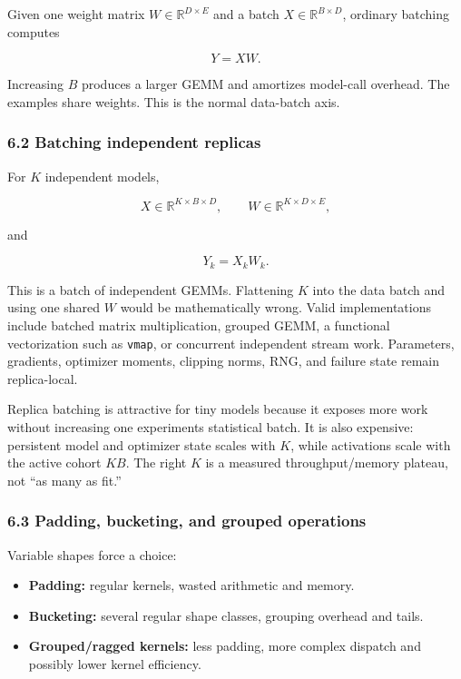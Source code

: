 \documentclass[
  10pt,
  letterpaper,
]{article}
\providecommand{\tightlist}{%
  \setlength{\itemsep}{0pt}\setlength{\parskip}{0pt}}
\begin{document}
Given one weight matrix \(W\in\mathbb{R}^{D\times E}\) and a batch
\(X\in\mathbb{R}^{B\times D}\), ordinary batching computes

\[
Y=XW.
\]

Increasing \(B\) produces a larger GEMM and amortizes model-call
overhead. The examples share weights. This is the normal data-batch
axis.

\subsubsection{6.2 Batching independent
replicas}\label{62-batching-independent-replicas}

For \(K\) independent models,

\[
X\in\mathbb{R}^{K\times B\times D},\qquad
W\in\mathbb{R}^{K\times D\times E},
\]

and

\[
Y_k=X_kW_k.
\]

This is a batch of independent GEMMs. Flattening \(K\) into the data
batch and using one shared \(W\) would be mathematically wrong. Valid
implementations include batched matrix multiplication, grouped GEMM, a
functional vectorization such as \texttt{vmap}, or concurrent
independent stream work. Parameters, gradients, optimizer moments,
clipping norms, RNG, and failure state remain replica-local.

Replica batching is attractive for tiny models because it exposes more
work without increasing one experiment\textquotesingle s statistical
batch. It is also expensive: persistent model and optimizer state scales
with \(K\), while activations scale with the active cohort \(K B\). The
right \(K\) is a measured throughput/memory plateau, not ``as many as
fit.''

\subsubsection{6.3 Padding, bucketing, and grouped
operations}\label{63-padding-bucketing-and-grouped-operations}

Variable shapes force a choice:

\begin{itemize}
\tightlist
\item
  \textbf{Padding:} regular kernels, wasted arithmetic and memory.
\item
  \textbf{Bucketing:} several regular shape classes, grouping overhead
  and tails.
\item
  \textbf{Grouped/ragged kernels:} less padding, more complex dispatch
  and possibly lower kernel efficiency.
\end{itemize}
\end{document}
